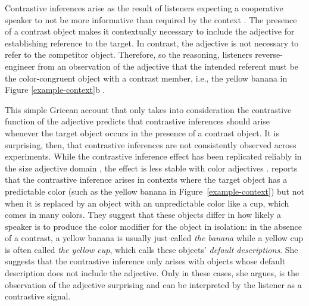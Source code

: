 \documentclass[10pt,letterpaper]{article}
\newcommand{\ek}[1]{\textcolor{Orange}{[ek: #1]}}
\newcommand{\figref}[1]{Figure \ref{#1}}
\begin{document}

Contrastive inferences arise as the result of listeners expecting a cooperative speaker to not be more informative than required by the context \cite{Grice:1975}. The presence of a contrast object makes it contextually necessary to include the adjective for establishing reference to the target. In contrast, the adjective is not necessary to refer to the competitor object. Therefore, so the reasoning, listeners reverse-engineer from an observation of the adjective that the intended referent must be the color-congruent object with a contrast member, i.e., the yellow banana in \figref{example-context}b \cite{Aparicio:2016,Aparicio:2018,Grodner:2005,Grodner:2011,Ryskin:2019,Sedivy:1999}.

This simple Gricean account that only takes into consideration the contrastive function of the adjective predicts that contrastive inferences should arise whenever the target object occurs in the presence of a contrast object. It is surprising, then, that contrastive inferences are not consistently observed across experiments. While the contrastive inference effect has been replicated reliably in the size adjective domain \cite{Aparicio:2016,Aparicio:2018,Grodner:2011,Ryskin:2019,Sedivy:1999}, the effect is less stable with color adjectives \cite{Sedivy:2003}.  reports that the contrastive inference arises in contexts where the target object has a predictable color (such as the yellow banana in Figure~\ref{example-context}) but not when it is replaced by an object with an unpredictable color like a cup, which comes in many colors.
They suggest that these objects differ in how likely a speaker is to produce the color modifier for the object in isolation: in the absence of a contrast, a yellow banana is usually just called \textit{the banana} while a yellow cup is often called \textit{the yellow cup}, which  calls these objects' \emph{default descriptions}. She suggests that the contrastive inference only arises with objects whose default description does not include the adjective. Only in these cases, she argues, is the observation of the adjective surprising and can be interpreted by the listener as a contrastive signal.
\end{document}
